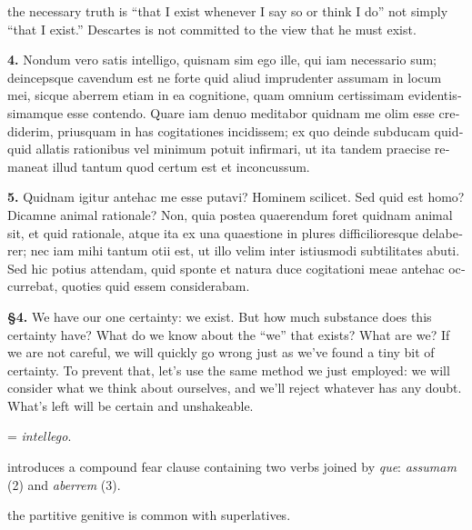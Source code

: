 the necessary truth is ``that I exist whenever I say so or think I do'' not simply ``that I exist.'' Descartes is not committed to the view that he must exist.

\clearpage

\beginnumbering
\pstart
\begin{latin}
    \textenglish{\textbf{4.}} Nondum vero satis intelligo, quisnam sim ego ille, qui iam necessario sum; deincepsque cavendum est ne forte quid aliud imprudenter assumam in locum mei, sicque aberrem etiam in ea cognitione, quam omnium certissimam evidentissimamque esse contendo. Quare iam denuo meditabor quidnam me olim esse crediderim, priusquam in has cogitationes incidissem; ex quo deinde subducam quidquid allatis rationibus vel minimum potuit infirmari, ut ita tandem praecise remaneat illud tantum quod certum est et inconcussum.
\end{latin}
\pend
\endnumbering

\beginnumbering
\pstart
\begin{latin}
    \textenglish{\textbf{5.}} Quidnam igitur antehac me esse putavi? Hominem scilicet. Sed quid est homo? Dicamne animal rationale? Non, quia postea quaerendum foret quidnam animal sit, et quid rationale, atque ita ex una quaestione in plures difficilioresque delaberer; nec iam mihi tantum otii est, ut illo velim inter istiusmodi subtilitates abuti. Sed hic potius attendam, quid sponte  et natura duce cogitationi meae antehac occurrebat, quoties quid essem considerabam.
\end{latin}
\pend
\endnumbering

\prenotes

\textbf{§4.} We have our one certainty: we exist. But how much substance does this certainty have? What do we know about the ``we'' that exists? What are we? If we are not careful, we will quickly go wrong just as we've found a tiny bit of certainty. To prevent that, let's use the same method we just employed: we will consider what we think about ourselves, and we'll reject whatever has any doubt. What's left will be certain and unshakeable.

 = \textit{intellego}.

 introduces a compound fear clause containing two verbs joined by \textit{que}: \textit{assumam} (2) and \textit{aberrem} (3).

 the partitive genitive is common with superlatives.

